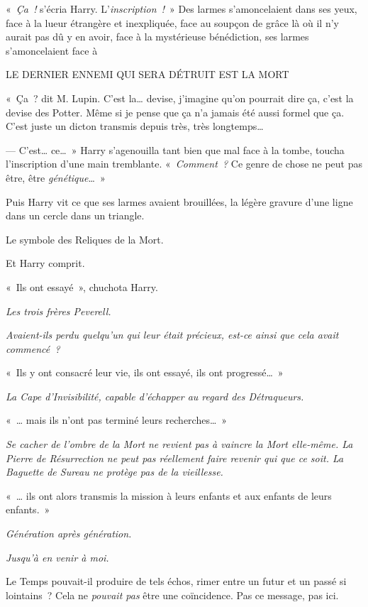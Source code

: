 «~\emph{Ça~!} s'écria Harry. L'\emph{inscription~!}~» Des larmes s'amoncelaient dans ses yeux, face à la lueur étrangère et inexpliquée, face au soupçon de grâce là où il n'y aurait pas dû y en avoir, face à la mystérieuse bénédiction, ses larmes s'amoncelaient face à
\begin{center}
LE DERNIER ENNEMI QUI SERA DÉTRUIT EST LA MORT
\end{center}

«~Ça~? dit M. Lupin. C'est la… devise, j'imagine qu'on pourrait dire ça, c'est la devise des Potter. Même si je pense que ça n'a jamais été aussi formel que ça. C'est juste un dicton transmis depuis très, très longtemps…

--- C'est… ce…~» Harry s'agenouilla tant bien que mal face à la tombe, toucha l'inscription d'une main tremblante. «~\emph{Comment~?} Ce genre de chose ne peut pas être, être \emph{génétique}…~»

Puis Harry vit ce que ses larmes avaient brouillées, la légère gravure d'une ligne dans un cercle dans un triangle.

Le symbole des Reliques de la Mort.

Et Harry comprit.

«~Ils ont essayé~», chuchota Harry.

\emph{Les trois frères Peverell.}

\emph{Avaient-ils perdu quelqu'un qui leur était précieux, est-ce ainsi que cela avait commencé~?}

«~Ils y ont consacré leur vie, ils ont essayé, ils ont progressé…~»

\emph{La Cape d'Invisibilité, capable d'échapper au regard des Détraqueurs.}

«~… mais ils n'ont pas terminé leurs recherches…~»

\emph{Se cacher de l'ombre de la Mort ne revient pas à vaincre la Mort elle-même. La Pierre de Résurrection ne peut pas réellement faire revenir qui que ce soit. La Baguette de Sureau ne protège pas de la vieillesse.}

«~… ils ont alors transmis la mission à leurs enfants et aux enfants de leurs enfants.~»

\emph{Génération après génération.}

\emph{Jusqu'à en venir à moi.}

Le Temps pouvait-il produire de tels échos, rimer entre un futur et un passé si lointains~? Cela ne \emph{pouvait pas} être une coïncidence. Pas ce message, pas ici.


